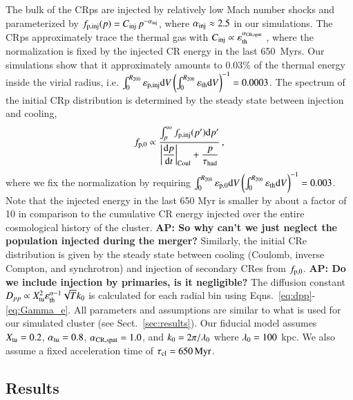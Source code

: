 \documentclass[fleqn,usenatbib,useAMS]{mnras}
\newcommand{\eps}{\varepsilon}
\def\AP2#1{{\bf  AP2: #1}}
\def\AP#1{{\bf {\color{blue} AP: #1}}}
\begin{document}
The bulk of the CRps are injected by relatively low Mach number shocks
and parameterized by $f_{\mathrm{p,inj}}(p) =
C_{\mathrm{inj}}\,p^{-\alpha_{\mathrm{inj}}}$, where $\alpha_{\mathrm{inj}}\approx
2.5$ in our simulations. The CRps approximately trace the thermal gas
with $C_\rmn{inj} \propto \eps_\rmn{th}^{\alpha_\rmn{CR,spat}}$
\citep{pinzke10,2016MNRAS.459...70V}, where the normalization is fixed
by the injected CR energy in the last 650~Myrs. Our simulations show
that it approximately amounts to 0.03\% of the thermal energy inside
the virial radius, i.e.  $\int_0^{R_{200}}\eps_\rmn{p,inj} \rmn{d}
V\left(\int_0^{R_{200}}\eps_\rmn{th} \rmn{d}V\right)^{-1} =
0.0003$. The spectrum of the initial CRp distribution is determined by
the steady state between injection and cooling,
\begin{equation}
 f_{\mathrm{p,0}} \propto \frac{\int_p^\infty f_{\mathrm{p,inj}}(p') 
{\mathrm{d}}p'}{\displaystyle\left|{{{\mathrm{d}}p}\over{{\mathrm{d}}t}}\right|_{\rm Coul}+\frac{p}{\tau_{\rm had}}}\,,
\end{equation}
where we fix the normalization by requiring
$\int_0^{R_{200}}\eps_\rmn{p,0}
\rmn{d}V\left(\int_0^{R_{200}}\eps_\rmn{th} \rmn{d}V\right)^{-1} =
0.003$. Note that the injected energy in the last 650 Myr is smaller
by about a factor of 10 in comparison to the cumulative CR energy
injected over the entire cosmological history of the cluster. \AP{So why can't we just neglect the population injected during the merger?}  
Similarly, the initial CRe distribution is given by the steady state
between cooling (Coulomb, inverse Compton, and synchrotron) and
injection of secondary CRes from $f_{\mathrm{p,0}}$. %
\AP{Do we include injection by primaries, is it negligible?} 
The diffusion constant $D_{pp} \propto X_{\rm tu}^{2} \eps_{\rm th}^{\alpha-1} \sqrt{T} k_{\rm 0}$ is calculated
for each radial bin using Eqns.~\ref{eq:dpp}-\ref{eq:Gamma_e}. All
parameters and assumptions are similar to what is used for our
simulated cluster (see Sect.~\ref{sec:results}). Our fiducial model assumes $X_{\rm tu} = 0.2$, $\alpha_{\rm tu} =0.8$, $\alpha_{\rm CR, spat}=1.0$, and $k_{\rm 0}=2 \pi/\lambda_{\rm 0}$ where $\lambda_{\rm 0}=100$ kpc. We also assume a fixed acceleration time of $\tau_{\rm cl} = 650 \, {\rm Myr}$. 


\subsection{Results}
\end{document}
